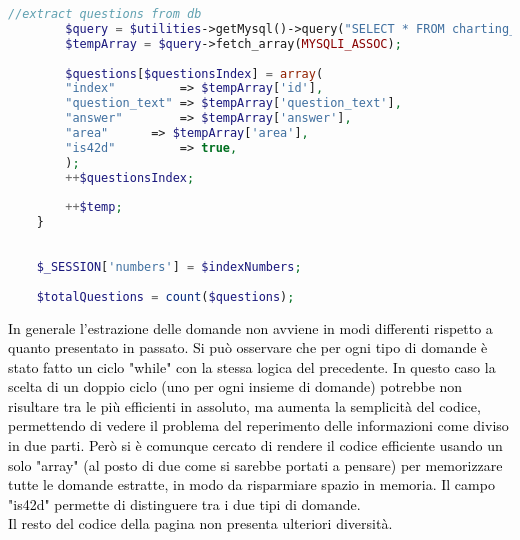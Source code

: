 \begin{lstlisting}[language=php]
		//extract questions from db
		$query = $utilities->getMysql()->query("SELECT * FROM charting_test_42d WHERE (id = '{$indexNumbers['42d'][$temp]}')");
		$tempArray = $query->fetch_array(MYSQLI_ASSOC);  
		
		$questions[$questionsIndex] = array(
		"index"         => $tempArray['id'],
		"question_text" => $tempArray['question_text'],
		"answer"        => $tempArray['answer'],
		"area"		=> $tempArray['area'],	
		"is42d"         => true,
		);
		++$questionsIndex;
		
		++$temp;
	}
	
	
	$_SESSION['numbers'] = $indexNumbers;
	
	$totalQuestions = count($questions);
\end{lstlisting}\leavevmode\newline


\begin{minipage}{\textwidth}
	\vspace*{-9cm}
	
	\textcolor{black}{In generale l'estrazione delle domande non avviene in modi differenti rispetto a quanto presentato in passato. Si può osservare che per ogni tipo di domande è stato fatto un ciclo "while" con la stessa logica del precedente. In questo caso la scelta di un doppio ciclo (uno per ogni insieme di domande) potrebbe non risultare tra le più efficienti in assoluto, ma aumenta la semplicità del codice, permettendo di vedere il problema del reperimento delle informazioni come diviso in due parti. Però si è comunque cercato di rendere il codice efficiente usando un solo "array" (al posto di due come si sarebbe portati a pensare) per memorizzare tutte le domande estratte, in modo da risparmiare spazio in memoria. Il campo "is42d" permette di distinguere tra i due tipi di domande.\\
	Il resto del codice della pagina non presenta ulteriori diversità.
	}\\
\end{minipage}%


